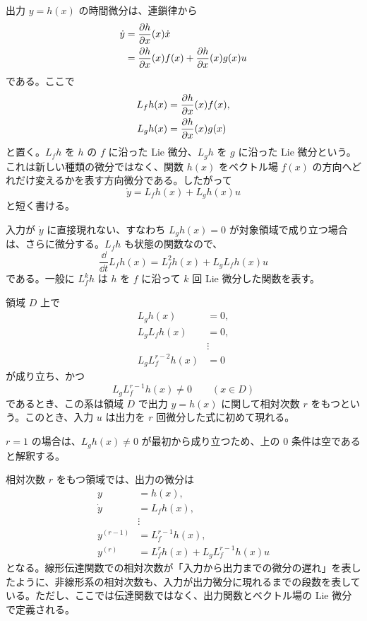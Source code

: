 出力 $y=h(x)$ の時間微分は、連鎖律から
\begin{align}
  \dot{y}
  &=\frac{\partial h}{\partial x}(x)\dot{x}\\
  &=\frac{\partial h}{\partial x}(x)f(x)
    +\frac{\partial h}{\partial x}(x)g(x)u
\end{align}
である。ここで
\begin{align}
  L_fh(x)&=\frac{\partial h}{\partial x}(x)f(x),\\
  L_gh(x)&=\frac{\partial h}{\partial x}(x)g(x)
\end{align}
と置く。$L_fh$ を $h$ の $f$ に沿った Lie 微分、$L_gh$ を $g$ に沿った Lie 微分という。これは新しい種類の微分ではなく、関数 $h(x)$ をベクトル場 $f(x)$ の方向へどれだけ変えるかを表す方向微分である。したがって
\begin{equation}
  \dot{y}=L_fh(x)+L_gh(x)u
\end{equation}
と短く書ける。

入力が $\dot{y}$ に直接現れない、すなわち $L_gh(x)=0$ が対象領域で成り立つ場合は、さらに微分する。$L_fh$ も状態の関数なので、
\begin{equation}
  \frac{\dd}{\dd t}L_fh(x)
  =L_f^2h(x)+L_gL_fh(x)u
\end{equation}
である。一般に $L_f^k h$ は $h$ を $f$ に沿って $k$ 回 Lie 微分した関数を表す。

\begin{definition}[相対次数]
領域 $D$ 上で
\begin{align}
  L_gh(x)&=0,\\
  L_gL_fh(x)&=0,\\
  &\vdots\\
  L_gL_f^{r-2}h(x)&=0
\end{align}
が成り立ち、かつ
\begin{equation}
  L_gL_f^{r-1}h(x)\ne0\qquad(x\in D)
\end{equation}
であるとき、この系は領域 $D$ で出力 $y=h(x)$ に関して相対次数 $r$ をもつという。このとき、入力 $u$ は出力を $r$ 回微分した式に初めて現れる。
\end{definition}

$r=1$ の場合は、$L_gh(x)\ne0$ が最初から成り立つため、上の 0 条件は空であると解釈する。

相対次数 $r$ をもつ領域では、出力の微分は
\begin{align}
  y&=h(x),\\
  \dot{y}&=L_fh(x),\\
  &\vdots\\
  y^{(r-1)}&=L_f^{r-1}h(x),\\
  y^{(r)}&=L_f^rh(x)+L_gL_f^{r-1}h(x)u
\end{align}
となる。線形伝達関数での相対次数が「入力から出力までの微分の遅れ」を表したように、非線形系の相対次数も、入力が出力微分に現れるまでの段数を表している。ただし、ここでは伝達関数ではなく、出力関数とベクトル場の Lie 微分で定義される。

